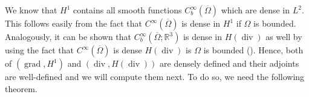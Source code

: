 \documentclass[12pt,a4paper]{article}
\numberwithin{equation}{subsection}
\numberwithin{lemma}{subsection}
\theoremstyle{definition}
\DeclareMathOperator{\diver}{div}
\DeclareMathOperator{\grad}{grad}
\DeclareMathOperator{\tr}{tr}
\newcommand{\real}{\mathbb{R}}
\begin{document}
    



We know that $H^1$ contains all smooth functions 
$C_b^\infty(\overline{\Omega})$ which are dense in $L^2$. This follows easily 
from the fact that $C^\infty(\overline{\Omega})$ is dense in $H^1$ if $\Omega$ is bounded.
Analogously,
it can be shown that $C_b^\infty(\overline{\Omega};\real^3)$ is dense in $H(\diver)$ as well 
by using the fact that $C^\infty(\overline{\Omega})$ is dense $H(\diver)$ is $\Omega$
is bounded (\cite[Thm. 3.22]{monk}).
Hence, 
both of $(\grad,H^1)$ and $(\diver,H(\diver))$ are densely defined and 
their adjoints are well-defined and we will compute them next. To do so, 
we need the following theorem.
\end{document}
